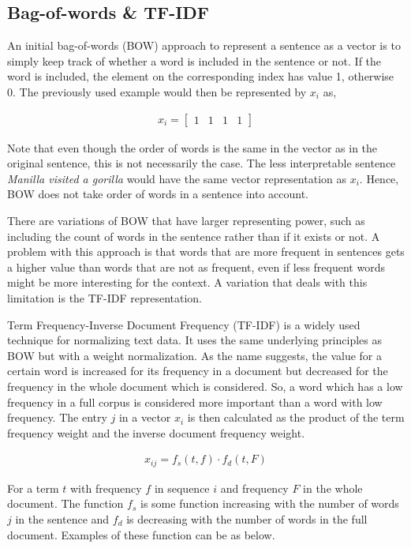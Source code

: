 \subsection{Bag-of-words \& TF-IDF}

An initial bag-of-words (BOW) approach to represent a sentence as a vector is to simply keep track of whether a word is included in the sentence or not. If the word is included, the element on the corresponding index has value 1, otherwise 0. The previously used example would then be represented by $x_i$ as, 


\begin{align*}
    x_i = \begin{bmatrix}
    1 & 1 & 1 & 1
    \end{bmatrix}
\end{align*}

Note that even though the order of words is the same in the vector as in the original sentence, this is not necessarily the case. The less interpretable sentence \textit{Manilla visited a gorilla} would have the same vector representation as $x_i$. Hence, BOW does not take order of words in a sentence into account. 

There are variations of BOW that have larger representing power, such as including the count of words in the sentence rather than if it exists or not. A problem with this approach is that words that are more frequent in sentences gets a higher value than words that are not as frequent, even if less frequent words might be more interesting for the context. A variation that deals with this limitation is the TF-IDF representation. 

Term Frequency-Inverse Document Frequency (TF-IDF) is a widely used technique for normalizing text data. It uses the same underlying principles as BOW but with a weight normalization. As the name suggests, the value for a certain word is increased for its frequency in a document but decreased for the frequency in the whole document which is considered. So, a word which has a low frequency in a full corpus is considered more important than a word with low frequency. The entry $j$ in a vector $x_i$ is then calculated as the product of the term frequency weight and the inverse document frequency weight. 

\begin{align*}
    x_{ij} = f_s(t,f) \cdot f_d(t,F)
\end{align*}

For a term $t$ with frequency $f$ in sequence $i$ and frequency $F$ in the whole document. The function $f_s$ is some function increasing with the number of words $j$ in the sentence and $f_d$ is decreasing with the number of words in the full document. Examples of these function can be as below. 

